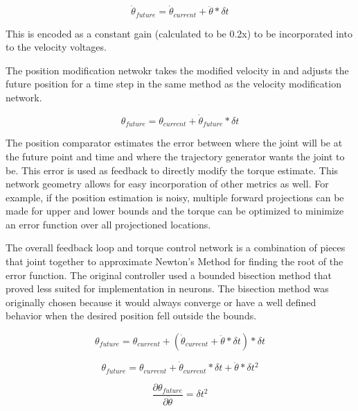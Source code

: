 \begin{equation}
\dot{\theta}_{future} = \dot{\theta}_{current} + \ddot{\theta} * \delta t
\end{equation}

This is encoded as a constant gain (calculated to be 0.2x) to be incorporated 
into to the velocity voltages.


The position modification netwokr takes the modified velocity in and adjusts the
future position for a time step in the same method as the velocity modification
network.

\begin{equation}
\theta_{future} = \theta_{current} + \dot{\theta}_{future} * \delta t
\end{equation}



The position comparator estimates the error between where the joint will be at
the future point and time and where the trajectory generator wants the joint
to be. This error is used as feedback to directly modify the torque estimate.
This network geometry allows for easy incorporation of other metrics as well.
For example, if the position estimation is noisy, multiple forward projections
can be made for upper and lower bounds and the torque can be optimized to 
minimize an error function over all projectioned locations.


The overall feedback loop and torque control network is a combination of pieces
that joint together to approximate
Newton's Method for finding the root of the error function. The original 
controller used a bounded bisection method that proved less suited for 
implementation in neurons. The bisection method was originally chosen because
it would always converge or have a well defined behavior when the desired
position fell outside the bounds.

\begin{equation}
\theta_{future} = \theta_{current} + (\dot{\theta}_{current} + \ddot{\theta} * \delta t) * \delta t
\end{equation}

\begin{equation}
\theta_{future} = \theta_{current} + \dot{\theta}_{current} * \delta t + \ddot{\theta} * \delta t^{2}
\end{equation}

\begin{equation}
\dfrac{\partial \theta_{future}}{\partial \ddot{\theta}} = \delta t^{2}
\end{equation}

